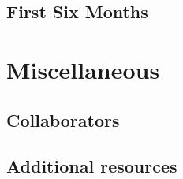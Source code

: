 \documentclass[
]{book}
\begin{document}
\hypertarget{first-six-months}{%
\section{First Six Months}\label{first-six-months}}

\hypertarget{miscellaneous}{%
\chapter{Miscellaneous}\label{miscellaneous}}

\hypertarget{collaborators}{%
\section{Collaborators}\label{collaborators}}

\hypertarget{extra-resources}{%
\section{Additional resources}\label{extra-resources}}

  
\end{document}
